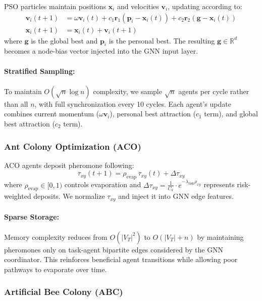 \documentclass{article}
\begin{document}
PSO particles maintain positions $\mathbf{x}_i$ and velocities $\mathbf{v}_i$, updating according to:
\begin{align}
\mathbf{v}_i(t{+}1) &= \omega\mathbf{v}_i(t) + c_1 \mathbf{r}_1(\mathbf{p}_i-\mathbf{x}_i(t)) + c_2 \mathbf{r}_2(\mathbf{g}-\mathbf{x}_i(t)) \\
\mathbf{x}_i(t{+}1) &= \mathbf{x}_i(t) + \mathbf{v}_i(t{+}1)
\end{align}
where $\mathbf{g}$ is the global best and $\mathbf{p}_i$ is the personal best. The resulting $\mathbf{g} \in \mathbb{R}^d$ becomes a node-bias vector injected into the GNN input layer.

\paragraph{Stratified Sampling:} To maintain $O(\sqrt{n} \log n)$ complexity, we sample $\sqrt{n}$ agents per cycle rather than all $n$, with full synchronization every 10 cycles. Each agent's update combines current momentum ($\omega \mathbf{v}_i$), personal best attraction ($c_1$ term), and global best attraction ($c_2$ term).

\subsubsection{Ant Colony Optimization (ACO)}
\label{subsubsec:aco}

ACO agents deposit pheromone following:
\begin{equation}
\tau_{xy}(t{+}1) = \rho_{\text{evap}}\,\tau_{xy}(t) + \Delta\tau_{xy}
\end{equation}
where $\rho_{\text{evap}} \in [0,1)$ controls evaporation and $\Delta\tau_{xy} = \frac{1}{C_k} \cdot e^{-\lambda_{\text{risk}} \rho_{xy}}$ represents risk-weighted deposits. We normalize $\tau_{xy}$ and inject it into GNN edge features.

\paragraph{Sparse Storage:} Memory complexity reduces from $O(|V_T|^2)$ to $O(|V_T| + n)$ by maintaining pheromones only on task-agent bipartite edges considered by the GNN coordinator. This reinforces beneficial agent transitions while allowing poor pathways to evaporate over time.

\subsubsection{Artificial Bee Colony (ABC)}
\label{subsubsec:abc}
\end{document}
